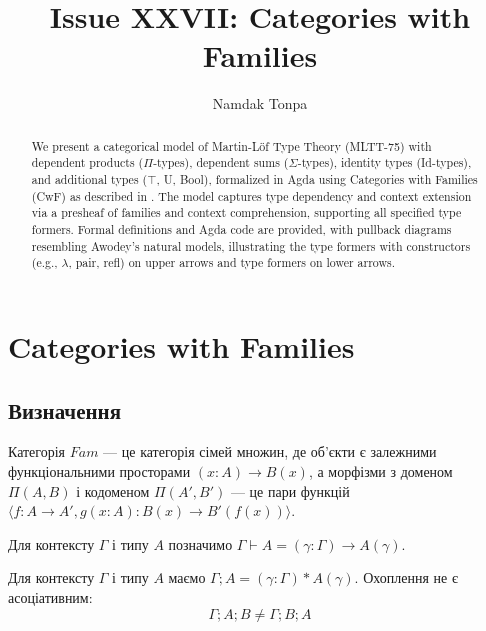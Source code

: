 \documentclass{article}
\begin{document}
\title{Issue XXVII: Categories with Families}
\author{Namdak Tonpa}
\date{}

\maketitle

\begin{abstract}
We present a categorical model of Martin-Löf Type Theory (MLTT-75) with dependent products ($\Pi$-types), dependent sums ($\Sigma$-types), identity types (Id-types), and additional types ($\top$, U, Bool), formalized in Agda using Categories with Families (CwF) as described in \cite{awodey2019}. The model captures type dependency and context extension via a presheaf of families and context comprehension, supporting all specified type formers. Formal definitions and Agda code are provided, with pullback diagrams resembling Awodey’s natural models, illustrating the type formers with constructors (e.g., $\lambda$, pair, refl) on upper arrows and type formers on lower arrows.
\end{abstract}

\section{Categories with Families}

\subsection{Визначення}

\begin{definition}[Fam]
Категорія $Fam$ --- це категорія сімей множин, де об’єкти є залежними функціональними просторами $(x:A)\rightarrow B(x)$, а морфізми з доменом $\Pi(A,B)$ і кодоменом $\Pi(A',B')$ --- це пари функцій $\langle f:A\rightarrow A', g(x:A):B(x)\rightarrow B'(f(x)) \rangle$.
\end{definition}

\begin{definition}[$\Pi$-похідність]
Для контексту $\Gamma$ і типу $A$ позначимо $\Gamma\vdash A = (\gamma:\Gamma)\rightarrow A(\gamma)$.
\end{definition}

\begin{definition}
Для контексту $\Gamma$ і типу $A$ маємо $\Gamma;A = (\gamma:\Gamma)*A(\gamma)$. Охоплення не є асоціативним:
\[
    \Gamma;A;B \neq \Gamma;B;A
\]
\end{definition}
\end{document}
